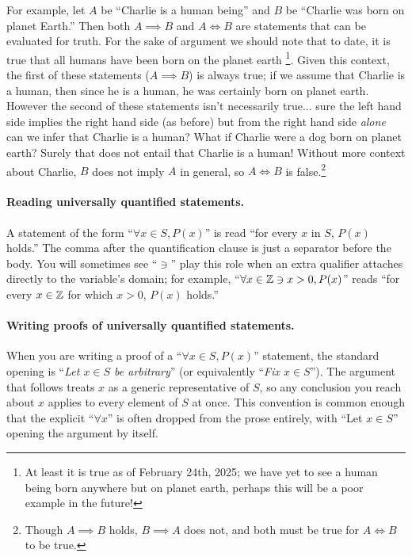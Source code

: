 For example, let $A$ be ``Charlie is a human being'' and $B$ be ``Charlie was born on planet Earth.'' Then both $A \implies B$ and $A \iff B$ are statements that can be evaluated for truth. 
For the sake of argument we should note that to date, it is true that all humans have been born on the planet earth \footnote{At least it is true as of February 24th, 2025; we have yet to see a human being born anywhere but on planet earth, perhaps this will be a poor example in the future!}. Given this context, the first of these statements ($A\implies B$) is always true; if we assume that Charlie is a human, then since he is a human, he was certainly born on planet earth. However the second of these statements isn't necessarily true... sure the left hand side implies the right hand side (as before) but from the right hand side \textit{alone} can we infer that Charlie is a human? What if Charlie were a dog born on planet earth? Surely that does not entail that Charlie is a human! Without more context about Charlie, $B$ does not imply $A$ in general, so $A \iff B$ is false.\footnote{Though $A\implies B$ holds, $B\implies A$ does not, and both must be true for $A \iff B$ to be true.}

\paragraph{Reading universally quantified statements.}
A statement of the form ``$\forall x \in S, P(x)$'' is read ``for every $x$ in $S$, $P(x)$ holds.'' The comma after the quantification clause is just a separator before the body. You will sometimes see ``$\ni$'' play this role when an extra qualifier attaches directly to the variable's domain; for example, ``$\forall x \in {\mathbb{Z}} \ni x > 0, P(x)$'' reads ``for every $x \in {\mathbb{Z}}$ for which $x > 0$, $P(x)$ holds.''
\newpage 
\paragraph{Writing proofs of universally quantified statements.}
When you are writing a proof of a ``$\forall x \in S, P(x)$'' statement, the standard opening is ``\textit{Let $x \in S$ be arbitrary}'' (or equivalently ``\textit{Fix $x \in S$}''). The argument that follows treats $x$ as a generic representative of $S$, so any conclusion you reach about $x$ applies to every element of $S$ at once. This convention is common enough that the explicit ``$\forall x$'' is often dropped from the prose entirely, with ``Let $x \in S$'' opening the argument by itself.

